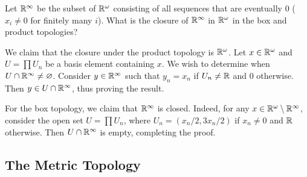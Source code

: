 	\begin{exercise}
		Let $\mathbb{R}^\infty$ be the subset of $\mathbb{R}^\omega$ consisting of all sequences that are eventually $0$ ($x_i\neq 0$ for finitely many $i$). What is the closure of $\mathbb{R}^\infty$ in $\mathbb{R}^\omega$ in the box and product topologies?
	\end{exercise}
	\begin{solution*}
		We claim that the closure under the product topology is $\mathbb{R}^\omega$. Let $x\in\mathbb{R}^\omega$ and $U=\prod U_n$ be a basis element containing $x$. We wish to determine when $U\cap\mathbb{R}^\infty\neq\varnothing$. Consider $y\in\mathbb{R}^\infty$ such that $y_n = x_n$ if $U_n\neq\mathbb{R}$ and $0$ otherwise. Then $y\in U\cap\mathbb{R}^\infty$, thus proving the result.

		For the box topology, we claim that $\mathbb{R}^\infty$ is closed. Indeed, for any $x\in\mathbb{R}^\omega\setminus\mathbb{R}^\infty$, consider the open set $U=\prod U_n$, where $U_n=(x_n/2, 3x_n/2)$ if $x_n\neq 0$ and $\mathbb{R}$ otherwise. Then $U\cap\mathbb{R}^\infty$ is empty, completing the proof.
	\end{solution*}


\subsection{The Metric Topology}

